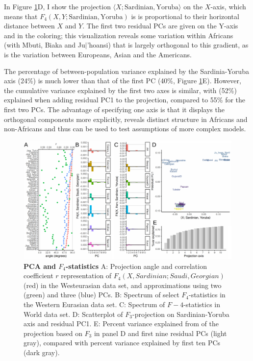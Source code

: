 \documentclass[12pt,fullpage, a4paper]{article}
\begin{document}
In Figure \ref{fig:f4}D, I show the projection $\langle X; \text{Sardinian}, \text{Yoruba} \rangle$ on the $X$-axis, which means that $F_4(X, Y; \text{Sardinian}, \text{Yoruba})$ is  is proportional to their horizontal distance between $X$ and $Y$. 
The first two residual PCs are given on the Y-axis and in the coloring; this visualization reveals some variation within Africans (with Mbuti, Biaka and Ju$\vert$'hoansi) that is largely orthogonal to this gradient, as is the variation between Europeans, Asian and the Americans. 

The percentage of between-population variance explained by the Sardinia-Yoruba axis (24\%) is much lower than that of the first PC (40\%, Figure \ref{fig:f4}E). However, the cumulative variance explained by the first two axes is similar, with (52\%) explained when adding residual PC1 to the projection, compared to 55\% for the first two PCs. The advantage of specifying one axis is that it displays the orthogonal components more explicitly, reveals distinct structure in Africans and non-Africans and thus can be used to test assumptions of more complex models.

\begin{figure}[!ht]
\includegraphics[width=\textwidth]{figures/fig_f4_data.pdf}	
	\caption{\textbf{PCA and $F_4$-statistics} A: Projection angle and correlation coefficient $r$ representation of $F_4(X, Sardinian; Saudi, Georgian)$ (red) in the Westeurasian data set, and approximations using two (green) and three (blue) PCs.
	B: Spectrum of select $F_4$-statistics in the Western Eurasian data set.  C: Spectrum of $F-4$-statistics in World data set. D: Scatterplot of $F_3$-projection on Sardinian-Yoruba axis  and residual PC1.
	E: Percent variance explained from of the projection based on $F_3$ in panel D and first nine residual PCs (light gray), compared with percent variance explained by first ten PCs (dark gray).
	}
\label{fig:f4}
\end{figure}
\end{document}
